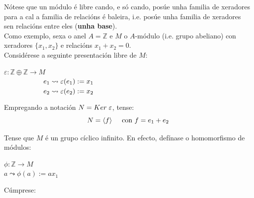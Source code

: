 \documentclass[twoside]{report}
\theoremstyle{mystyle}
\begin{document}
\noindent Nótese que un módulo é libre cando, e só cando, posúe unha familia de xeradores para a cal a familia de relacións é baleira, i.e. posúe unha familia de xeradores sen relacións entre eles (\textbf{unha base}).\\

\noindent Como exemplo, sexa o anel $A = \mathbb{Z}$ e $M$ o $A$-módulo (i.e. grupo abeliano) con xeradores $\{x_{1}, x_{2}\}$ e relacións $x_{1} + x_{2} = 0$.\\

\noindent Considérese a seguinte presentación libre de $M$:

\begin{center}
    $\varepsilon: \mathbb{Z} \oplus \mathbb{Z} \longrightarrow M$\\
    \vspace{2mm}
    $\hspace{20mm} e_{1} \leadsto \varepsilon(e_{1}) := x_{1}$\\
    $\hspace{20mm} e_{2} \leadsto \varepsilon(e_{2}) := x_{2}$
\end{center}

\noindent Empregando a notación $N = Ker \hspace{1mm} \varepsilon$, tense:
$$N = \langle f \rangle \hspace{5mm} \text{con } f = e_{1} + e_{2}$$

\noindent Tense que $M$ é un grupo cíclico infinito. En efecto, defínase o homomorfismo de módulos:
\begin{center}
    $\phi: \mathbb{Z} \longrightarrow M$\\
    \vspace{2mm}
    $a \leadsto \phi(a) := ax_{1}$
\end{center}

\noindent Cúmprese:
\end{document}
